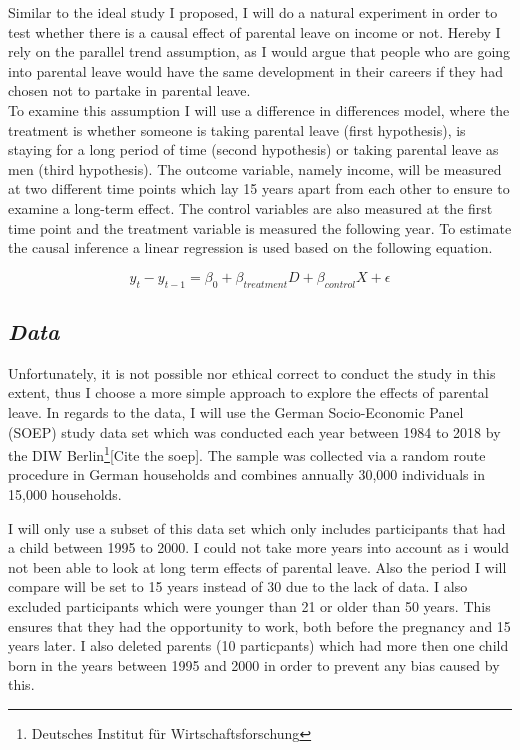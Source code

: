 \documentclass[
  12pt,
]{article}
\begin{document}
Similar to the ideal study I proposed, I will do a natural experiment in order to test whether there is a causal effect of parental leave on income or not. Hereby I rely on the parallel trend assumption, as I would argue that people who are going into parental leave would have the same development in their careers if they had chosen not to partake in parental leave.\\
To examine this assumption I will use a difference in differences model, where the treatment is whether someone is taking parental leave (first hypothesis), is staying for a long period of time (second hypothesis) or taking parental leave as men (third hypothesis).
The outcome variable, namely income, will be measured at two different time points which lay 15 years apart from each other to ensure to examine a long-term effect. The control variables are also measured at the first time point and the treatment variable is measured the following year.
To estimate the causal inference a linear regression is used based on the following equation.

\[y_t - y_{t-1} = \beta_0 + \beta_{treatment} D + \beta_{control} X + \epsilon \]

\hypertarget{data}{%
\subsection*{\texorpdfstring{\emph{Data}}{Data}}\label{data}}

Unfortunately, it is not possible nor ethical correct to conduct the study in this extent, thus I choose a more simple approach to explore the effects of parental leave.
In regards to the data, I will use the German Socio-Economic Panel (SOEP) study data set which was conducted each year between 1984 to 2018 by the DIW Berlin\footnote{Deutsches Institut für Wirtschaftsforschung}{[}Cite the soep{]}. The sample was collected via a random route procedure in German households and combines annually 30,000 individuals in 15,000 households.

I will only use a subset of this data set which only includes participants that had a child between 1995 to 2000. I could not take more years into account as i would not been able to look at long term effects of parental leave. Also the period I will compare will be set to 15 years instead of 30 due to the lack of data.
I also excluded participants which were younger than 21 or older than 50 years. This ensures that they had the opportunity to work, both before the pregnancy and 15 years later. I also deleted parents (10 particpants) which had more then one child born in the years between 1995 and 2000 in order to prevent any bias caused by this.
\end{document}
